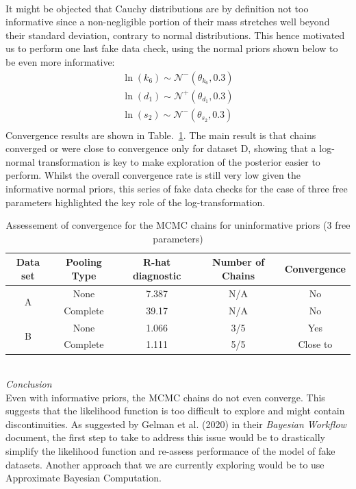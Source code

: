 \documentclass[11pt]{article}
\begin{document}
\\[12pt]
It might be objected that Cauchy distributions are by definition not too informative since a non-negligible portion of their mass stretches well beyond their standard deviation, contrary to normal distributions. This hence motivated us to perform one last fake data check, using the normal priors shown below to be even more informative: 
\begin{align*}
    \ln(k_6) \sim \mathcal{N}^-(\theta_{k_6}, 0.3) \\ 
    \ln(d_1) \sim \mathcal{N}^+(\theta_{d_1}, 0.3) \\ 
    \ln(s_2) \sim \mathcal{N}^-(\theta_{s_2}, 0.3) \\ 
\end{align*}
Convergence results are shown in Table.~\ref{tbl:rhat_4}. The main result is that chains converged or were close to convergence only for dataset D, showing that a log-normal transformation is key to make exploration of the posterior easier to perform. Whilst the overall convergence rate is still very low given the informative normal priors, this series of fake data checks for the case of three free parameters highlighted the key role of the log-transformation.

\begin{table}[!h]
    \centering
    \caption{Assessement of convergence for the MCMC chains for uninformative priors (3 free parameters)}
    \begin{tabular}{c|c||c|c|c}
        \hline
        Data set & Pooling Type & R-hat diagnostic & Number of Chains & Convergence  \\ \hline 
        \multirow{2}{*}{A}      & None     & 7.387 & N/A & No \\
                                & Complete & 39.17 & N/A & No \\ \hline 
        \multirow{2}{*}{B}      & None     & 1.066 & 3/5 & Yes \\
                                & Complete & 1.111 & 5/5 & Close to \\ \hline 
    \end{tabular}
    \label{tbl:rhat_4}
\end{table}
~\\
\textit{Conclusion}\\[5pt]
Even with informative priors, the MCMC chains do not even converge. This suggests that the likelihood function is too difficult to explore and might contain discontinuities. As suggested by Gelman et al. (2020) in their \textit{Bayesian Workflow} document, the first step to take to address this issue would be to drastically simplify the likelihood function and re-assess performance of the model of fake datasets. Another approach that we are currently exploring would be to use Approximate Bayesian Computation.

\newpage 
\clearpage
\newpage



\end{document}
